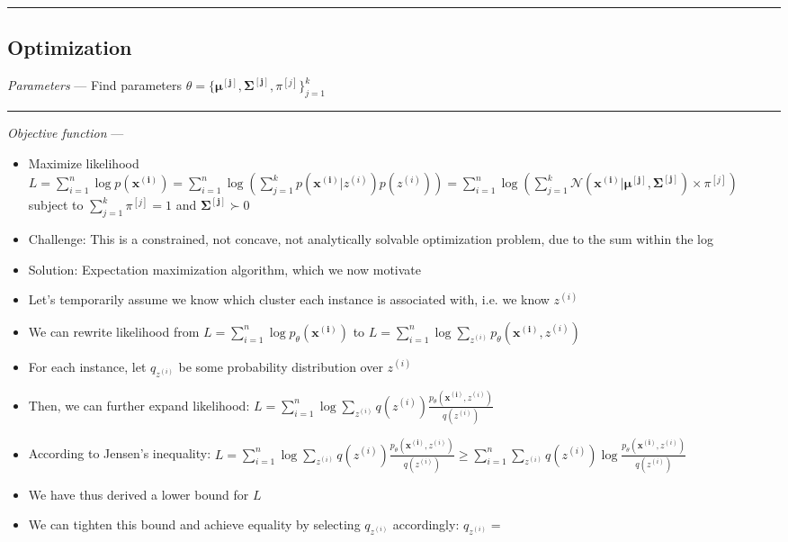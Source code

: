 {\color{black}\hrule height 0.001mm}

\subsection*{Optimization}
\emph{Parameters} --- Find parameters $\theta = \{\boldsymbol{\mu^{[j]}}, \boldsymbol{\Sigma^{[j]}}, \pi^{[j]}\}_{j=1}^k$

{\color{lightgray}\hrule height 0.001mm}

\emph{Objective function} --- 
\begin{itemize}
    \item Maximize likelihood $L = \sum_{i=1}^n \log p( \boldsymbol{x^{(i)}}) = \sum_{i=1}^n \log (\sum_{j=1}^k p(\boldsymbol{x^{(i)}} | z^{(i)}) p(z^{(i)})) = \sum_{i=1}^n \log( \sum_{j=1}^k \mathcal{N}(\boldsymbol{x^{(i)}} | \boldsymbol{\mu^{[j]}}, \boldsymbol{\Sigma^{[j]}}) \times \pi^{[j]} ) $ subject to $\sum_{j=1}^k \pi^{[j]} = 1$ and $\boldsymbol{\Sigma^{[j]}} \succ 0$
    \item Challenge: This is a constrained, not concave, not analytically solvable optimization problem, due to the sum within the log
    \item Solution: Expectation maximization algorithm, which we now motivate 
    \item Let's temporarily assume we know which cluster each instance is associated with, i.e. we know $z^{(i)}$
    \item We can rewrite likelihood from $L = \sum_{i=1}^n \log p_\theta( \boldsymbol{x^{(i)}})$ to $L = \sum_{i=1}^n \log \sum_{z^{(i)}} p_\theta( \boldsymbol{x^{(i)}}, z^{(i)})$
    \item For each instance, let $q_{z^{(i)}}$ be some probability distribution over $z^{(i)}$
    \item Then, we can further expand likelihood: $L = \sum_{i=1}^n \log \sum_{z^{(i)}} q(z^{(i)}) \frac{p_\theta( \boldsymbol{x^{(i)}}, z^{(i)})}{q(z^{(i)})}$
    \item According to Jensen's inequality: $L = \sum_{i=1}^n \log \sum_{z^{(i)}} q(z^{(i)}) \frac{p_\theta( \boldsymbol{x^{(i)}}, z^{(i)})}{q(z^{(i)})} \geq \sum_{i=1}^n \sum_{z^{(i)}} q(z^{(i)}) \log \frac{p_\theta( \boldsymbol{x^{(i)}}, z^{(i)})}{q(z^{(i)})}$
    \item We have thus derived a lower bound for $L$
    \item We can tighten this bound and achieve equality by selecting $q_{z^{(i)}}$ accordingly: $q_{z^{(i)}} = $\\

\end{itemize}
